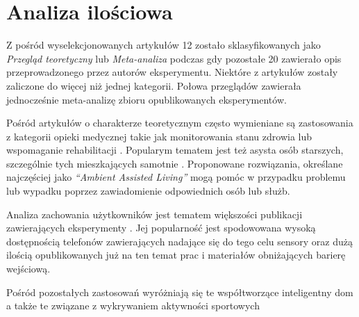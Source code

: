 \section{Analiza ilościowa}
Z pośród wyselekcjonowanych artykułów 12 zostało sklasyfikowanych jako \textit{Przegląd teoretyczny} lub \textit{Meta-analiza} podczas gdy pozostałe 20 zawierało opis przeprowadzonego przez autorów eksperymentu. Niektóre z artykułów zostały zaliczone do więcej niż jednej kategorii. Połowa przeglądów zawierała jednocześnie meta-analizę zbioru opublikowanych eksperymentów.

Pośród artykułów o charakterze teoretycznym często wymieniane są zastosowania z kategorii opieki medycznej takie jak monitorowania stanu zdrowia \cite{22_HAR_Survey_Ultrasonic} lub wspomaganie rehabilitacji \cite{35_HAR_Wearable_Review}. Popularym tematem jest też asysta osób starszych, szczególnie tych mieszkających samotnie \cite{21_HAR_Smartphone}. Proponowane rozwiązania, określane najczęściej jako \textit{``Ambient Assisted Living''} mogą pomóc w przypadku problemu lub wypadku poprzez zawiadomienie odpowiednich osób lub służb.

Analiza zachowania użytkowników jest tematem większości publikacji zawierających eksperymenty \cite{2_Real_Time_HAR, 59_Air_Pressure_HAR, 33_Inertial_Study}. Jej popularność jest spodowowana wysoką dostępnością telefonów zawierających nadające się do tego celu sensory oraz dużą ilością opublikowanych już na ten temat prac i materiałów obniżających barierę wejściową.

Pośród pozostałych zastosowań wyróżniają się te współtworzące inteligentny dom \cite{36_Smart_Home_HAR} a także te związane z wykrywaniem aktywności sportowych \cite{29_Daily_Sport_HAR}


